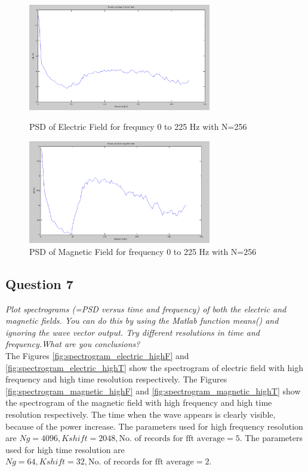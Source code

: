 \documentclass{article}
\begin{document}
\begin{figure}[htb!]
\begin{minipage}[c]{0.5\linewidth}
\centering
\includegraphics[width=8cm]{Figures/PSD_electric_N_256.png}
\caption{PSD of Electric Field for frequncy 0 to 225 Hz with N=256}
\label{fig:PSD_electric_N_256}
\end{minipage}
\hspace{0.1cm}
\begin{minipage}[c]{0.5\linewidth}
\centering
\includegraphics[width=8cm]{Figures/PSD_magnetic_N_256.png}
\caption{PSD of Magnetic Field for frequency 0 to 225 Hz with N=256}
\label{fig:PSD_magnetic_N_256}
\end{minipage}
\end{figure}


\subsection{Question 7}
\textit{Plot spectrograms (=PSD versus time and frequency) of both the electric and magnetic fields. You can do this by using the Matlab function means() and ignoring the wave vector output. Try different resolutions in time and frequency.What are you conclusions?}\\

The Figures \ref{fig:spectrogram_electric_highF} and \ref{fig:spectrogram_electric_highT} show the spectrogram of electric field with high frequency and high time resolution respectively. The Figures \ref{fig:spectrogram_magnetic_highF} and \ref{fig:spectrogram_magnetic_highT} show the spectrogram of the magnetic field with high frequency and high time resolution respectively. The time when the wave appears is clearly visible, because of the power increase. The parameters used for high frequency resolution are $Ng = 4096, Kshift = 2048, \mbox{No. of records for fft average} = 5$. The parameters used for high time resolution are $Ng = 64, Kshift = 32, \mbox{No. of records for fft average} = 2$.
\end{document}
